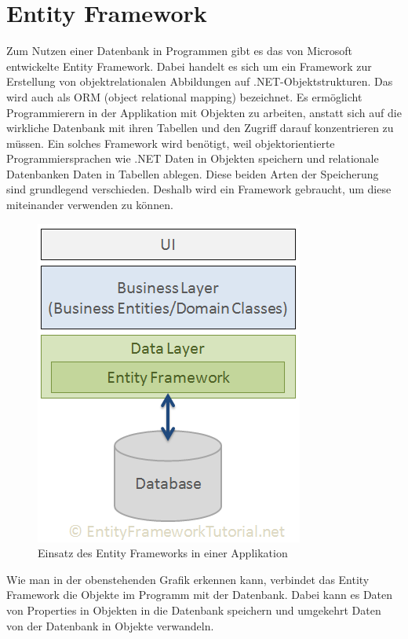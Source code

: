 \section{Entity Framework}
Zum Nutzen einer Datenbank in Programmen gibt es das von Microsoft entwickelte Entity Framework. Dabei handelt es sich um ein Framework zur Erstellung von objekt\-relationalen Abbildungen auf .NET-Objektstrukturen. Das wird auch als ORM (object relational mapping) bezeichnet. Es ermöglicht Programmierern in der Applikation mit Objekten zu arbeiten, anstatt sich auf die wirkliche Datenbank mit ihren Tabellen und den Zugriff darauf konzentrieren zu müssen. Ein solches Framework wird benötigt, weil objektorientierte Programmiersprachen wie .NET Daten in Objekten speichern und relationale Datenbanken Daten in Tabellen ablegen. Diese beiden Arten der Speicherung sind grundlegend verschieden. Deshalb wird ein Framework gebraucht, um diese miteinander verwenden zu können.
\begin{figure}[H]
\begin{center}
	\includegraphics[scale=.65]{images/ef.png}
\end{center}
	\caption{Einsatz des Entity Frameworks in einer Applikation}
	\label{fig:sample}
\end{figure}
\noindent Wie man in der obenstehenden Grafik erkennen kann, verbindet das Entity Framework die Objekte im Programm mit der Datenbank. Dabei kann es Daten von Properties in  Objekten in die Datenbank speichern und umgekehrt Daten von der Datenbank in Objekte verwandeln. \newline
